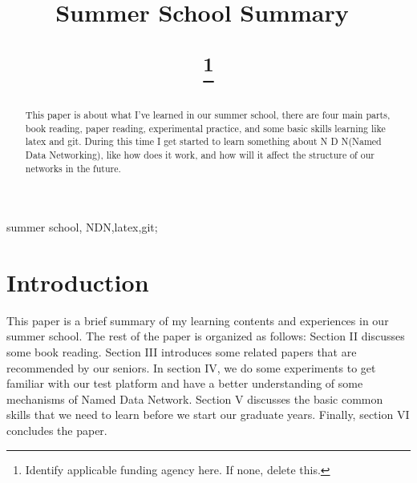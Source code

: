 \documentclass[conference]{IEEEtran}
\begin{document}
\title{Summer School Summary\

\thanks{Identify applicable funding agency here. If none, delete this.}
}

\author{
}

\maketitle

\begin{abstract}
This paper is about what I've learned in our summer school, there are four main parts, book reading, paper reading, experimental practice, and some basic skills learning like latex and git. During this time I get started to learn something about N D N(Named Data Networking), like how does it work, and how will it affect the structure of our networks in the future.
\end{abstract}

\begin{IEEEkeywords}
summer school, NDN,latex,git;
\end{IEEEkeywords}

\section{Introduction}
This paper is a brief summary of my learning contents and experiences in our summer school. The rest of the paper is organized as follows: Section II discusses some book reading. Section III introduces some related papers that are recommended by our seniors. In section IV, we do some experiments to get familiar with our test platform and have a better understanding of some mechanisms of Named Data Network. Section V discusses the basic common skills that we need to learn before we start our graduate years. Finally, section VI concludes the paper. 
\end{document}
